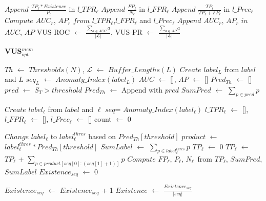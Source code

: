 \begin{algorithm}[tb]
{{{{            }
            $Append$ $\frac{TP_\ell*Existence}{P_\ell}$ in $l\_TPR_{\ell}$\;
            $Append$ $\frac{FP_\ell}{N_\ell}$ in $l\_FPR_{\ell}$\;
            $Append$ $\frac{TP_\ell}{TP_\ell+FP_\ell}$ in $l\_Prec_{\ell}$\;
        }
        $Compute$ $AUC_r$, $AP_r$ $from$ $l\_TPR_{\ell}$,$l\_FPR_{\ell}$ and $l\_Prec_{\ell}$\;
        $Append$ $AUC_r$, $AP_r$ $in$ $AUC$, $AP$\;
    } \label{line_vus:dyn_e}
    VUS-ROC $\leftarrow$ $\frac{\sum_{a\in AUC}a}{|\mathcal{L}|}$, 
    VUS-PR $\leftarrow$ $\frac{\sum_{a\in AP}a}{|\mathcal{L}|}$\;
 }
\end{algorithm}

\begin{algorithm}
{\small
    \caption{\textbf{VUS$_{opt}^{mem}$}}\label{alg:VUS_opt^{mem}}
    \BlankLine
    $Th$ $\leftarrow$ $Thresholds(N)$,
    $\mathcal{L}$ $\leftarrow$ $Buffer\_Lengths(L)$\;
    $Create$ $label_L$ from $label$ and $L$\;
    $seq_L$ $\leftarrow$ $Anomaly\_Index(label_L)$\;
    $AUC$ $\leftarrow$ [], 
    $AP$ $\leftarrow$ []\; 
    $Pred_{Th}$ $\leftarrow$ []\;
    {
        $pred$ $\leftarrow$ $S_{T}>threshold$\;
        $Pred_{Th}$ $\leftarrow$ Append with $pred$\;
        $SumPred$ $\leftarrow$ $\sum_{p\in pred} p$\;
    }
    {
        $Create$ $label_\ell$ from $label$ and $\ell$\;
        $seq$= $Anomaly\_Index(label_\ell)$\;
        $l\_TPR_{\ell}$ $\leftarrow$ [],
        $l\_FPR_{\ell}$ $\leftarrow$ [],
        $l\_Prec_{\ell}$ $\leftarrow$ []\;
        count $\leftarrow$ 0\;
        {  
            $Change$ $label_\ell$ to $label_\ell^{thres}$ based on $Pred_{Th}[threshold]$\;
            $product$ $\leftarrow$ $label_\ell^{thres}*Pred_{Th}[threshold]$\;
            $SumLabel$ $\leftarrow$ $\sum_{p\in label_\ell^{thres}} p$\;
            $TP_\ell$ $\leftarrow$ 0\;
            {
                $TP_\ell$ $\leftarrow$ $TP_\ell$ + $\sum_{p\in product[seg[0]:(seg[1]+1)]}p$
            }
            $Compute$ $FP_\ell$, $P_\ell$, $N_\ell$\ from $TP_\ell$, $SumPred$, $SumLabel$\;
            $Existence_{seq}$ $\leftarrow$ 0\;
            {
                {
                    $Existence_{seq}$ $\leftarrow$ $Existence_{seq}$ + 1
                }
                $Existence$ $\leftarrow$ $\frac{Existence_{seq}}{|seq|}$
                  
}}}}
\end{algorithm}
